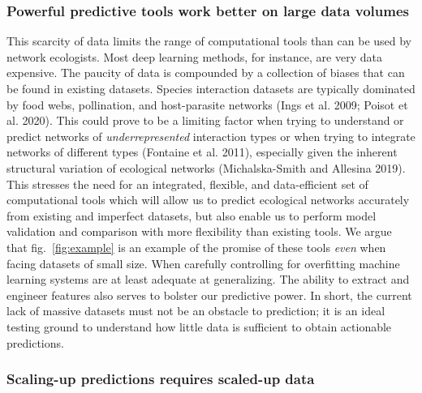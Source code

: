 \documentclass[11pt]{article}
\begin{document}
\hypertarget{powerful-predictive-tools-work-better-on-large-data-volumes}{%
\subsubsection{Powerful predictive tools work better on large data
volumes}\label{powerful-predictive-tools-work-better-on-large-data-volumes}}

This scarcity of data limits the range of computational tools than can
be used by network ecologists. Most deep learning methods, for instance,
are very data expensive. The paucity of data is compounded by a
collection of biases that can be found in existing datasets. Species
interaction datasets are typically dominated by food webs, pollination,
and host-parasite networks (Ings et al. 2009; Poisot et al. 2020). This
could prove to be a limiting factor when trying to understand or predict
networks of \emph{underrepresented} interaction types or when trying to
integrate networks of different types (Fontaine et al. 2011), especially
given the inherent structural variation of ecological networks
(Michalska-Smith and Allesina 2019). This stresses the need for an
integrated, flexible, and data-efficient set of computational tools
which will allow us to predict ecological networks accurately from
existing and imperfect datasets, but also enable us to perform model
validation and comparison with more flexibility than existing tools. We
argue that fig.~\ref{fig:example} is an example of the promise of these
tools \emph{even} when facing datasets of small size. When carefully
controlling for overfitting machine learning systems are at least
adequate at generalizing. The ability to extract and engineer features
also serves to bolster our predictive power. In short, the current lack
of massive datasets must not be an obstacle to prediction; it is an
ideal testing ground to understand how little data is sufficient to
obtain actionable predictions.

\hypertarget{scaling-up-predictions-requires-scaled-up-data}{%
\subsubsection{Scaling-up predictions requires scaled-up
data}\label{scaling-up-predictions-requires-scaled-up-data}}
\end{document}
